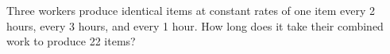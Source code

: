 Three workers produce identical items at constant rates of one item every 2 hours, every 3 hours, and every 1 hour. How long does it take their combined work to produce 22 items?
